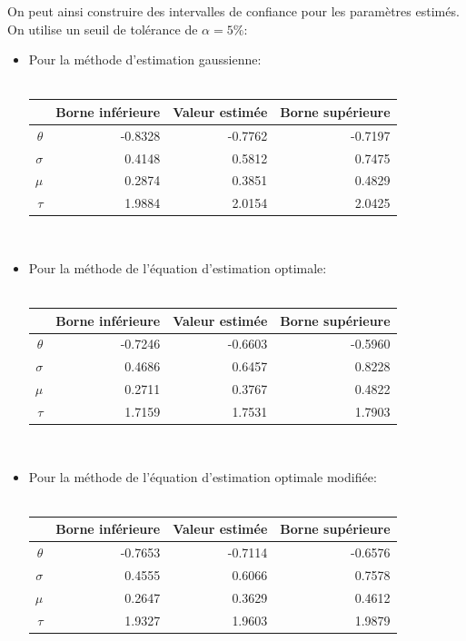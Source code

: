 On peut ainsi construire des intervalles de confiance pour les
paramètres estimés. On utilise un seuil de tolérance de $\alpha=5\%$:
\begin{itemize}
\item Pour la méthode d'estimation gaussienne:\\ \\
  \begin{tabular}{rrrr}
    \hline
    & \textbf{Borne inférieure} & \textbf{Valeur estimée} & \textbf{Borne supérieure} \\
    \hline
    $\theta$ & -0.8328 & -0.7762 & -0.7197 \\ 
    $\sigma$ & 0.4148 & 0.5812 & 0.7475 \\ 
    $\mu$ & 0.2874 & 0.3851 & 0.4829 \\ 
    $\tau$ & 1.9884 & 2.0154 & 2.0425 \\ 
    \hline
  \end{tabular}\\

\item Pour la méthode de l'équation d'estimation optimale:\\ \\
  \begin{tabular}{rrrr}
    \hline
    & \textbf{Borne inférieure} & \textbf{Valeur estimée} & \textbf{Borne supérieure} \\
    \hline
    $\theta$ & -0.7246 & -0.6603 & -0.5960 \\ 
    $\sigma$ & 0.4686 & 0.6457 & 0.8228 \\ 
    $\mu$ & 0.2711 & 0.3767 & 0.4822 \\ 
    $\tau$ & 1.7159 & 1.7531 & 1.7903 \\ 
    \hline
  \end{tabular}\\

\item Pour la méthode de l'équation d'estimation optimale modifiée:\\ \\
\begin{tabular}{rrrr}
  \hline 
  & \textbf{Borne inférieure} & \textbf{Valeur estimée} & \textbf{Borne supérieure} \\ 
  \hline
  $\theta$ & -0.7653 & -0.7114 & -0.6576 \\ 
  $\sigma$ & 0.4555 & 0.6066 & 0.7578 \\ 
  $\mu$ & 0.2647 & 0.3629 & 0.4612 \\ 
  $\tau$ & 1.9327 & 1.9603 & 1.9879 \\ 
  \hline
\end{tabular}\\

\end{itemize}

